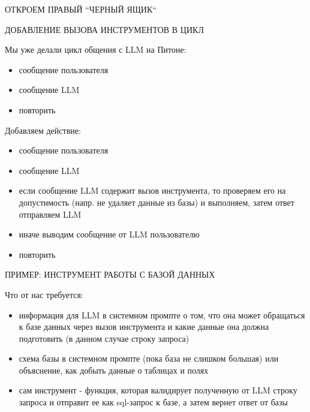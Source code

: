 \documentclass[aspectratio=169]{beamer}
\begin{document}
{\begin{frame}{ОТКРОЕМ ПРАВЫЙ ``ЧЕРНЫЙ ЯЩИК``}
    
    \end{frame} 

\begin{frame}{ДОБАВЛЕНИЕ ВЫЗОВА ИНСТРУМЕНТОВ В ЦИКЛ}
    
    Мы уже делали цикл общения с LLM на Питоне:
    
    \begin{itemize}
        \item [-] сообщение пользователя
        \item [-] сообщение LLM
        \item [-] повторить
    \end{itemize}
    
    Добавляем действие:
    
    \begin{itemize}
        \item [-] сообщение пользователя
        \item [-] сообщение LLM
        \item [-] если сообщение LLM содержит вызов инструмента, то проверяем его на допустимость (напр. не удаляет данные из базы) и выполняем, затем ответ отправляем LLM
        \item [-] иначе выводим сообщение от LLM пользователю
        \item [-] повторить        
    \end{itemize}
    
    
\end{frame}  



 \begin{frame}{ПРИМЕР: ИНСТРУМЕНТ РАБОТЫ С БАЗОЙ ДАННЫХ}
    
    Что от нас требуется:
    
    \begin{itemize}
        \item [-] информация для LLM в системном промпте о том, что она может обращаться к базе данных через вызов инструмента и какие данные она должна подготовить (в данном случае строку запроса)
        \item [-] схема базы в системном промпте (пока база не слишком большая) или объяснение, как добыть данные о таблицах и полях
        \item [-] сам инструмент - функция, которая валидирует полученную от LLM строку запроса и отправит ее как sql-запрос к базе, а затем вернет ответ от базы
    \end{itemize}
    

\end{frame}}
\end{document}
